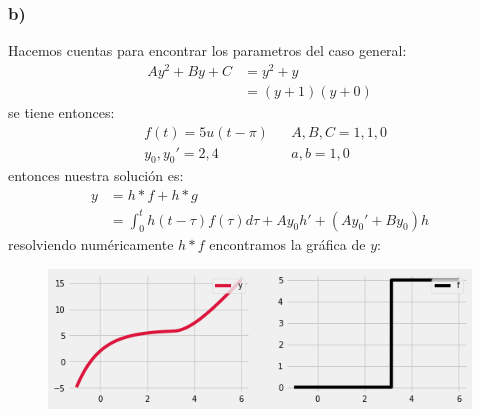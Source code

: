 \documentclass{article}
\begin{document}
\begin{tcolorbox}[breakable]
    \subsubsection*{b)}
    Hacemos cuentas para encontrar los parametros del caso general:
    \begin{align*}
        Ay^2 + By + C 
        &= y^2 + y \\
        &= (y+1)(y+0)
    \end{align*}
    se tiene entonces:
    \begin{align*}
        &f(t) = 5u(t-\pi) 
        &&A, B, C = 1,1,0 \\
        &y_0, y_0' = 2, 4 
        &&a,b = 1,0 
    \end{align*}
    entonces nuestra solución es:
    \begin{align*}
        y 
        &= h*f + h*g \\
        &= \int_{0}^t h(t-\tau)f(\tau)d\tau  + Ay_0h' + (Ay_0'+By_0)h 
    \end{align*}
    resolviendo numéricamente $h*f$ encontramos la gráfica de $y$:
    \begin{figure}[H]
        \centering
        \includegraphics[scale=0.7]{images/p1_2.png}
    \end{figure}

\end{tcolorbox}
\end{document}
